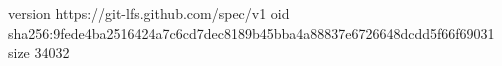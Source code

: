 version https://git-lfs.github.com/spec/v1
oid sha256:9fede4ba2516424a7c6cd7dec8189b45bba4a88837e6726648dcdd5f66f69031
size 34032
